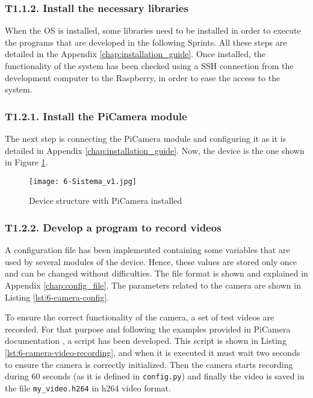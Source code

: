 \subsubsection{T1.1.2. Install the necessary libraries}
When the \ac{OS} is installed, some libraries need to be installed in order to execute the programs that are developed in the following Sprints. All these steps are detailed in the Appendix \ref{chap:installation_guide}. Once installed, the functionality of the system has been checked using a SSH connection from the development computer to the Raspberry, in order to ease the access to the system. 

\subsubsection{T1.2.1. Install the PiCamera module}
The next step is connecting the PiCamera module and configuring it as it is detailed in Appendix \ref{chap:installation_guide}. Now, the device is the one shown in Figure \ref{fig:6-Sistema_v1}. 

\begin{figure}[!h]
	\begin{center}
		\texttt{[image: 6-Sistema\_v1.jpg]}
		\caption{Device structure with PiCamera installed}
		\label{fig:6-Sistema_v1}
	\end{center}
\end{figure}

\subsubsection{T1.2.2. Develop a program to record videos}
A configuration file has been implemented containing some variables that are used by several modules of the device. Hence, these values are stored only once and can be changed without difficulties. The file format is shown and explained in Appendix \ref{chap:config_file}. The parameters related to the camera are shown in Listing \ref{lst:6-camera-config}.



To ensure the correct functionality of the camera, a set of test videos are recorded. For that purpose and following the examples provided in PiCamera documentation \cite{PiCameraDoc}, a script has been developed. This script is shown in Listing \ref{lst:6-camera-video-recording}, and when it is executed it must wait two seconds to ensure the camera is correctly initialized. Then the camera starts recording during 60 seconds (as it is defined in \texttt{config.py}) and finally the video is saved in the file \texttt{my\_video.h264} in h264 video format.

